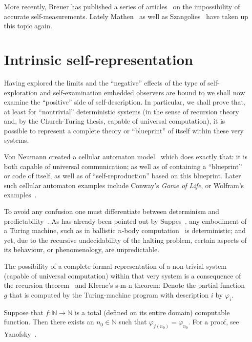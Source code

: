 More recently, Breuer has published a series of articles~\cite{Breuer1995,Breuer1996,Breuer1999}
on the impossibility of accurate self-measurements.
Lately
Mathen~\cite{Mathen-2011,Mathen-2017}
as well as Szangolies~\cite{Szangolies:2015:1611-8812:169,Szangolies-16}
have taken up this topic again.





\chapter{Intrinsic self-representation}
\label{2016-pu-book-chapter-isr}

Having  explored the limits and the ``negative'' effects of the type of self-exploration and self-examination
embedded observers are bound to we shall now examine the ``positive'' side of self-description.
In particular, we shall prove that, at least for ``nontrivial''
deterministic systems (in the sense of recursion theory and,
by the Church-Turing thesis, capable of universal computation),
it is possible to represent a complete theory
or ``blueprint''
of itself within these very systems.

Von Neumann created a cellular automaton model~\cite{v-neumann-66}
which does exactly that: it is both capable of universal communication;
as well as of containing a ``blueprint'' or code of itself,
as well as of ``self-reproduction'' based on this blueprint.
Later such cellular automaton examples include Conway's {\em Game of Life},
or Wolfram's examples~\cite{wolfram-2002}.


To avoid any confusion one must differentiate between determinism and predictability~\cite{Myrvold2011237}.
As has already been pointed out by Suppes~\cite{suppes-1993}, any embodiment of a Turing machine,
such as in ballistic $n$-body computation~\cite{svozil-2007-cestial}
is deterministic; and yet, due to the recursive undecidability of the halting problem,
certain aspects of its behaviour, or phenomenology, are unpredictable.

The possibility of a complete formal representation of a non-trivial system (capable of universal computation)
within that very system is a consequence of the recursion theorem~\cite{Yanofsky-BSL:9051621}
and Kleene's s-m-n theorem:
Denote the partial function $g$ that is computed by the Turing-machine
program with description $i$ by $\varphi_i$.

Suppose that $f: {\mathbb N} \longrightarrow {\mathbb N}$ is a total (defined on its entire domain) computable function.
Then there exists an $n_0 \in {\mathbb N}$ such that $\varphi_{f(n_0)}=\varphi_{n_0}$.
For a proof, see Yanofsky~\cite{Yanofsky-BSL:9051621}.

